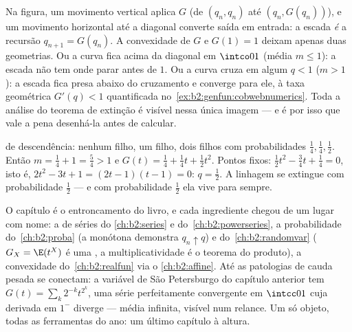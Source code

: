 \begin{remark}
Na figura, um movimento vertical aplica $G$ (de $(q_n, q_n)$
até $(q_n, G(q_n))$), e um movimento horizontal até a diagonal
converte saída em entrada: a escada \emph{é} a
recursão $q_{n+1} = G(q_n)$. A convexidade de $G$ e $G(1) = 1$
deixam apenas duas geometrias. Ou a curva fica acima da
diagonal em $\intco01$ (média $m \leq 1$): a escada não tem
onde parar antes de $1$. Ou a curva cruza em algum $q <
1$ ($m > 1$): a escada fica presa abaixo do cruzamento
e converge para ele, à taxa geométrica $G'(q) < 1$
quantificada no~\cref{ex:b2:genfun:cobwebnumerics}. Toda a
análise do teorema de extinção é visível nessa única
imagem --- e é por isso que vale a pena desenhá-la antes de
calcular.
\end{remark}

\begin{example}\label{ex:b2:genfun:branchingexample}
 de descendência: nenhum filho, um filho, dois filhos com
probabilidades $\frac14, \frac14, \frac12$. Então $m = \frac14 + 1 =
\frac54 > 1$ e $G(t) = \frac14 + \frac14 t + \frac12 t^2$. Pontos
fixos: $\frac12 t^2 - \frac34 t + \frac14 = 0$, isto é, $2t^2 - 3t
+ 1 = (2t - 1)(t - 1) = 0$: $q = \frac12$. A linhagem se extingue
com probabilidade $\frac12$ --- e com probabilidade $\frac12$
ela vive para sempre.
\end{example}

\begin{remark}
O capítulo é o entroncamento do livro, e cada ingrediente
chegou de um lugar com nome: a  de séries do
\cref{ch:b2:series} e do~\cref{ch:b2:powerseries}, a
probabilidade do~\cref{ch:b2:proba} (a  monótona
demonstra $q_n \uparrow q$) e do~\cref{ch:b2:randomvar} ($G_X =
\E(t^X)$ é uma , a multiplicatividade é o teorema
do produto), a convexidade do~\cref{ch:b2:realfun} via o
\cref{ch:b2:affine}. Até as patologias de cauda pesada se conectam:
a variável de São Petersburgo do capítulo anterior tem
$G(t) = \sum_k2^{-k}t^{2^k}$, uma série perfeitamente convergente
em $\intcc01$ cuja derivada em $1^-$ diverge ---
média infinita, visível num relance. Um só objeto, todas as ferramentas
do ano: um último capítulo à altura.
\end{remark}

